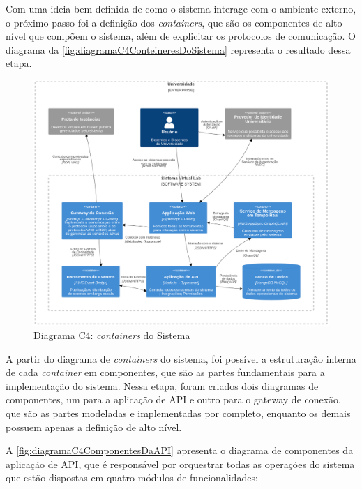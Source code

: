 Com uma ideia bem definida de como o sistema interage com o ambiente externo, o próximo passo foi a definição dos \textit{containers}, que são os componentes de alto nível que compõem o sistema, além de explicitar os protocolos de comunicação. O diagrama da \autoref{fig:diagramaC4ConteineresDoSistema} representa o resultado dessa etapa.

\begin{figure}[H]
\caption{Diagrama C4: \textit{containers} do Sistema}
\label{fig:diagramaC4ConteineresDoSistema}
\includegraphics[width=\textwidth]{capitulos/2-metodologia/files/c4-container.png}
\end{figure}

A partir do diagrama de \textit{containers} do sistema, foi possível a estruturação interna de cada \textit{container} em componentes, que são as partes fundamentais para a implementação do sistema.
Nessa etapa, foram criados dois diagramas de componentes, um para a aplicação de API e outro para o gateway de conexão, que são as partes modeladas e implementadas por completo, enquanto os demais possuem apenas a definição de alto nível.

A \autoref{fig:diagramaC4ComponentesDaAPI} apresenta o diagrama de componentes da aplicação de API, que é responsável por orquestrar todas as operações do sistema que estão dispostas em quatro módulos de funcionalidades:

